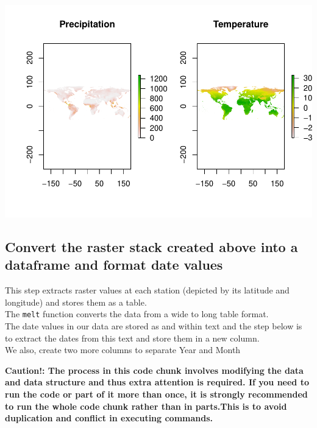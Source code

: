 \documentclass[
]{book}
\begin{document}
\includegraphics{_main_files/figure-latex/unnamed-chunk-19-1.pdf}

\hypertarget{convert-the-raster-stack-created-above-into-a-dataframe-and-format-date-values}{%
\subsection{Convert the raster stack created above into a dataframe and format date values}\label{convert-the-raster-stack-created-above-into-a-dataframe-and-format-date-values}}

This step extracts raster values at each station (depicted by its latitude and longitude) and stores them as a table.\\
The \texttt{melt} function converts the data from a wide to long table format.\\
The date values in our data are stored as and within text and the step below is to extract the dates from this text and store them in a new column.\\
We also, create two more columns to separate Year and Month

\textbf{Caution!: The process in this code chunk involves modifying the data and data structure and thus extra attention is required. If you need to run the code or part of it more than once, it is strongly recommended to run the whole code chunk rather than in parts.This is to avoid duplication and conflict in executing commands.}
\end{document}
